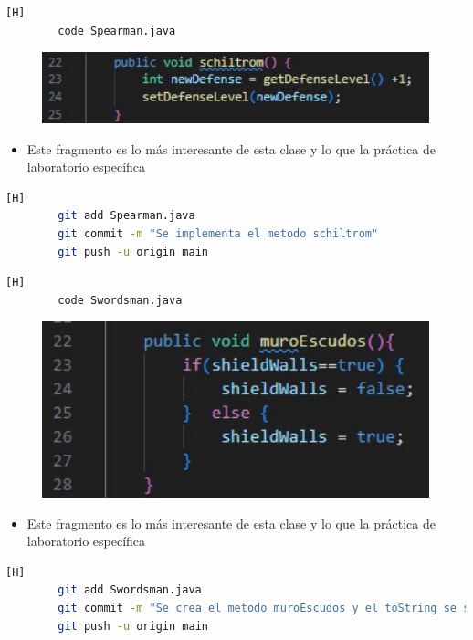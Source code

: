 \documentclass{article}
\begin{document}
	
	\begin{lstlisting}[language=bash,caption={Se crea la subclase Spearman }][H]
		code Spearman.java
	\end{lstlisting}
	\begin{figure}[H]
		\centering
		\includegraphics[width=1\textwidth,keepaspectratio]{img/spearman.jpg}
	\end{figure}
	\begin{itemize}	
		\item Este fragmento es lo más interesante de esta clase y lo que la práctica de laboratorio específica  
	\end{itemize}	
	\begin{lstlisting}[language=bash,caption={Commit: 2039a89dc9095c3a2a7acd26f64f5efeddae5e23 }][H]
		git add Spearman.java
		git commit -m "Se implementa el metodo schiltrom"			
		git push -u origin main
	\end{lstlisting}
	
	

	\begin{lstlisting}[language=bash,caption={Se crea la subclase Swordsman }][H]
		code Swordsman.java
	\end{lstlisting}
	\begin{figure}[H]
		\centering
		\includegraphics[width=1\textwidth,keepaspectratio]{img/muro.jpg}
	\end{figure}
	\begin{itemize}	
		\item Este fragmento es lo más interesante de esta clase y lo que la práctica de laboratorio específica  
	\end{itemize}	
	\begin{lstlisting}[language=bash,caption={Commit: 82b0ba62ff23779dc047659700c9991032678c3b }][H]
		git add Swordsman.java
		git commit -m "Se crea el metodo muroEscudos y el toString se sobreescribe"			
		git push -u origin main
	\end{lstlisting}
	
\end{document}
